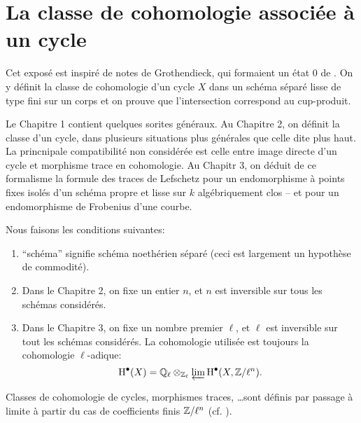 \chapter{La classe de cohomologie associée à un cycle}\label{IV}




Cet expos\'e est inspir\'e de notes de Grothendieck, qui formaient un \'etat 0 
de \cite[IV]{sga5}. On y d\'efinit la classe de cohomologie d'un cycle $X$ dans 
un sch\'ema s\'epar\'e lisse de type fini sur un corps et on prouve que 
l'intersection correspond au cup-produit.

Le Chapitre 1 contient quelques sorites g\'en\'eraux. Au Chapitre 2, on 
d\'efinit la classe d'un cycle, dans plusieurs situations plus g\'en\'erales 
que celle dite plus haut. La princnipale compatibilit\'e non consid\'er\'ee est 
celle entre image directe d'un cycle et morphisme trace en cohomologie. Au 
Chapitr 3, on d\'eduit de ce formalisme la formule des traces de Lefschetz pour 
un endomorphisme \`a points fixes isol\'es d'un sch\'ema propre et lisse sur $k$ 
alg\'ebriquement clos -- et pour un endomorphisme de Frobenius d'une courbe. 

Nous faisons les conditions suivantes:
\begin{enumerate}[\indent 1)]
  \item ``sch\'ema'' signifie sch\'ema noeth\'erien s\'epar\'e (ceci est 
    largement un hypoth\`ese de commodit\'e).
  \item Dans le Chapitre 2, on fixe un entier $n$, et $n$ est inversible sur 
    tous les sch\'emas consid\'er\'es.
  \item Dans le Chapitre 3, on fixe un nombre premier $\ell$, et $\ell$ est 
    inversible sur tout les sch\'emas consid\'er\'es. La cohomologie utilis\'ee 
    est toujours la cohomologie $\ell$-adique:
    \[
      \operatorname{H}^\bullet(X) = \mathbb{Q}_\ell\otimes_{\mathbb{Z}_\ell} \varprojlim \operatorname{H}^\bullet(X,\mathbb{Z}/\ell^n) \text{.}
    \]
\end{enumerate}
Classes de cohomologie de cycles, morphismes traces, \ldots sont d\'efinis par 
passage \`a limite \`a partir du cas de coefficients finis $\mathbb{Z}/\ell^n$ (cf. 
\cite[VI]{sga5}).




















